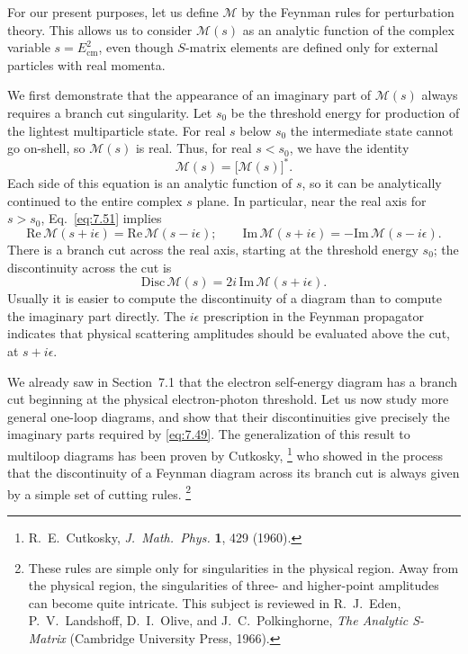 For our present purposes, let us define $\mathcal{M}$ by the Feynman rules
for perturbation theory.  This allows us to consider $\mathcal{M}(s)$ as an
analytic function of the complex variable $s = E^2_{\mathrm{cm}}$, even though
$S$-matrix elements are defined only for external particles with real momenta.

We first demonstrate that the appearance of an imaginary part of
$\mathcal{M}(s)$ always requires a branch cut singularity.  Let $s_0$ be the
threshold energy for production of the lightest multiparticle state.  For real
$s$ below $s_0$ the intermediate state cannot go on-shell, so
$\mathcal{M}(s)$ is real.  Thus, for real $s < s_0$, we have the identity
\begin{equation}
  \mathcal{M}(s) = \bigl[ \mathcal{M}(s) \bigr]^{*} .
  \label{eq:7.51}
\end{equation}
Each side of this equation is an analytic function of $s$, so it can be
analytically continued to the entire complex $s$ plane.  In particular, near
the real axis for $s > s_0$, Eq.~\eqref{eq:7.51} implies
\begin{equation}
  \mathrm{Re}\,\mathcal{M}(s+i\epsilon) = \mathrm{Re}\,\mathcal{M}(s-i\epsilon);
  \qquad
  \mathrm{Im}\,\mathcal{M}(s+i\epsilon) = -\mathrm{Im}\,\mathcal{M}(s-i\epsilon).
\end{equation}
There is a branch cut across the real axis, starting at the threshold energy
$s_0$; the discontinuity across the cut is
\begin{equation}
  \mathrm{Disc}\,\mathcal{M}(s) = 2i\,\mathrm{Im}\,\mathcal{M}(s+i\epsilon) .
\end{equation}
Usually it is easier to compute the discontinuity of a diagram than to
compute the imaginary part directly.  The $i\epsilon$ prescription in the
Feynman propagator indicates that physical scattering amplitudes should be
evaluated above the cut, at $s+i\epsilon$.

We already saw in Section~7.1 that the electron self-energy diagram has a
branch cut beginning at the physical electron-photon threshold.  Let us now
study more general one-loop diagrams, and show that their discontinuities give
precisely the imaginary parts required by \eqref{eq:7.49}.  The generalization
of this result to multiloop diagrams has been proven by Cutkosky,%
\footnote{R.~E.~Cutkosky, \emph{J.\ Math.\ Phys.} \textbf{1}, 429 (1960).} who
showed in the process that the discontinuity of a Feynman diagram across its
branch cut is always given by a simple set of cutting rules.%
\footnote{These rules are simple only for singularities in the physical
region.  Away from the physical region, the singularities of three- and
higher-point amplitudes can become quite intricate.  This subject is reviewed
in R.~J.~Eden, P.~V.~Landshoff, D.~I.~Olive, and J.~C.~Polkinghorne,
\emph{The Analytic S-Matrix} (Cambridge University Press, 1966).}

